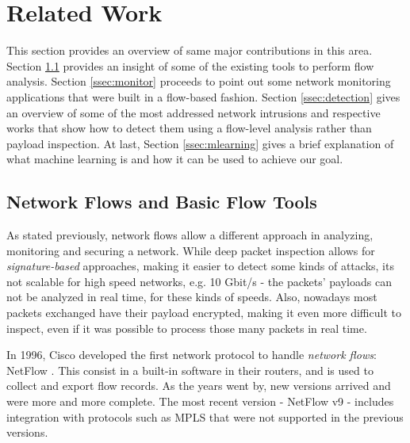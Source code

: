 \documentclass[runningheads,a4paper]{llncs}
\begin{document}
\section{Related Work}\label{sec:related}

This section provides an overview of same major contributions in this area. Section \ref{ssec:tools} provides an insight of some of the existing tools to perform flow analysis. Section \ref{ssec:monitor} proceeds to point out some network monitoring applications that were built in a flow-based fashion. Section \ref{ssec:detection} gives an overview of some of the most addressed network intrusions and respective works that show how to detect them using a flow-level analysis rather than payload inspection. At last, Section \ref{ssec:mlearning} gives a brief explanation of what machine learning is and how it can be used to achieve our goal. 


\subsection{Network Flows and Basic Flow Tools}\label{ssec:tools}

As stated previously, network flows allow a different approach in analyzing, monitoring and securing a network. While deep packet inspection allows for \textit{signature-based} approaches, making it easier to detect some kinds of attacks, its not scalable for high speed networks, e.g. 10 Gbit/s \cite{Sperotto2010} - the packets' payloads can not be analyzed in real time, for these kinds of speeds. Also, nowadays most packets exchanged have their payload encrypted, making it even more difficult to inspect, even if it was possible to process those many packets in real time. 


In 1996, Cisco developed the first network protocol to handle \textit{network flows}: NetFlow \cite{Claise2004}. This consist in a built-in software in their routers, and is used to collect and export flow records. As the years went by, new versions arrived and were more and more complete. The most recent version - NetFlow v9 - includes integration with protocols such as MPLS that were not supported in the previous versions.
\end{document}
